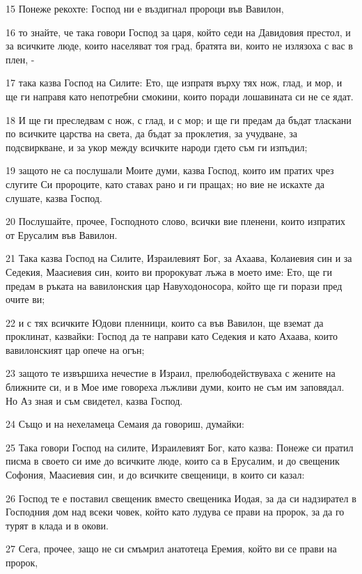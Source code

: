 \par 15 Понеже рекохте: Господ ни е въздигнал пророци във Вавилон,
\par 16 то знайте, че така говори Господ за царя, който седи на Давидовия престол, и за всичките люде, които населяват тоя град, братята ви, които не излязоха с вас в плен, -
\par 17 така казва Господ на Силите: Ето, ще изпратя върху тях нож, глад, и мор, и ще ги направя като непотребни смокини, които поради лошавината си не се ядат.
\par 18 И ще ги преследвам с нож, с глад, и с мор; и ще ги предам да бъдат тласкани по всичките царства на света, да бъдат за проклетия, за учудване, за подсвиркване, и за укор между всичките народи гдето съм ги изпъдил;
\par 19 защото не са послушали Моите думи, казва Господ, които им пратих чрез слугите Си пророците, като ставах рано и ги пращах; но вие не искахте да слушате, казва Господ.
\par 20 Послушайте, прочее, Господното слово, всички вие пленени, които изпратих от Ерусалим във Вавилон.
\par 21 Така казва Господ на Силите, Израилевият Бог, за Ахаава, Колаиевия син и за Седекия, Маасиевия син, които ви пророкуват лъжа в моето име: Ето, ще ги предам в ръката на вавилонския цар Навуходоносора, който ще ги порази пред очите ви;
\par 22 и с тях всичките Юдови пленници, които са във Вавилон, ще вземат да проклинат, казвайки: Господ да те направи като Седекия и като Ахаава, които вавилонският цар опече на огън;
\par 23 защото те извършиха нечестие в Израил, прелюбодействуваха с жените на ближните си, и в Мое име говореха лъжливи думи, които не съм им заповядал. Но Аз зная и съм свидетел, казва Господ.
\par 24 Също и на нехеламеца Семаия да говориш, думайки:
\par 25 Така говори Господ на силите, Израилевият Бог, като казва: Понеже си пратил писма в своето си име до всичките люде, които са в Ерусалим, и до свещеник Софония, Маасиевия син, и до всичките свещеници, в които си казал:
\par 26 Господ те е поставил свещеник вместо свещеника Иодая, за да си надзирател в Господния дом над всеки човек, който като лудува се прави на пророк, за да го турят в клада и в окови.
\par 27 Сега, прочее, защо не си смъмрил анатотеца Еремия, който ви се прави на пророк,
